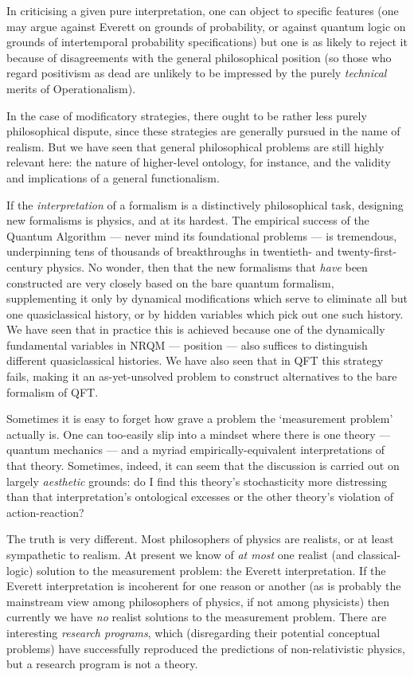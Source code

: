 \documentclass[12pt]{article}
\begin{document}
In criticising a given pure interpretation, one can object to specific features (one may argue against Everett on grounds of probability, or against quantum logic on grounds of intertemporal probability specifications) but one is as likely to reject it because of disagreements with the general philosophical position (so those who regard positivism as dead are unlikely to be impressed by the purely \emph{technical} merits of Operationalism).

In the case of modificatory strategies, there ought to be rather less purely philosophical dispute, since these strategies are generally pursued in the name of realism. But we have seen that general philosophical problems are still highly relevant here: the nature of higher-level ontology, for instance, and the validity and implications of a general functionalism. 

If the \emph{interpretation} of a formalism is a distinctively philosophical task, designing new formalisms is physics, and at its hardest. The empirical success of the Quantum Algorithm --- never mind its foundational problems  --- is tremendous, underpinning tens of thousands of breakthroughs in twentieth- and twenty-first-century physics. No wonder, then that the new formalisms that \emph{have} been constructed are very closely based on the bare quantum formalism, supplementing it only by dynamical modifications which serve to eliminate all but one quasiclassical history, or by hidden variables which pick out one such history. We have seen that in practice this is achieved because one of the dynamically fundamental variables in NRQM --- position --- also suffices to distinguish different quasiclassical histories. We have also seen that in QFT this strategy fails, making it an as-yet-unsolved problem to construct alternatives to the bare formalism of QFT. 

Sometimes it is easy to forget how grave a problem the `measurement problem' actually is. One can too-easily slip into a mindset where there is one theory --- quantum mechanics --- and a myriad empirically-equivalent interpretations of that theory. Sometimes, indeed, it can seem that the discussion is carried out on largely \emph{aesthetic} grounds: do I find this theory's stochasticity more distressing than that interpretation's ontological excesses  or the other theory's violation of action-reaction?

The truth is very different. Most philosophers of physics are realists, or at least sympathetic to realism. At present we know of \emph{at most} one realist (and classical-logic) solution to the measurement problem: the Everett interpretation. If the Everett interpretation is incoherent for one reason or another (as is probably the mainstream view among philosophers of physics, if not among physicists) then currently we have \emph{no} realist solutions to the measurement problem. There are interesting \emph{research programs}, which (disregarding their potential conceptual problems)  have successfully reproduced the predictions of non-relativistic physics, but a research program is not a theory.
\end{document}
